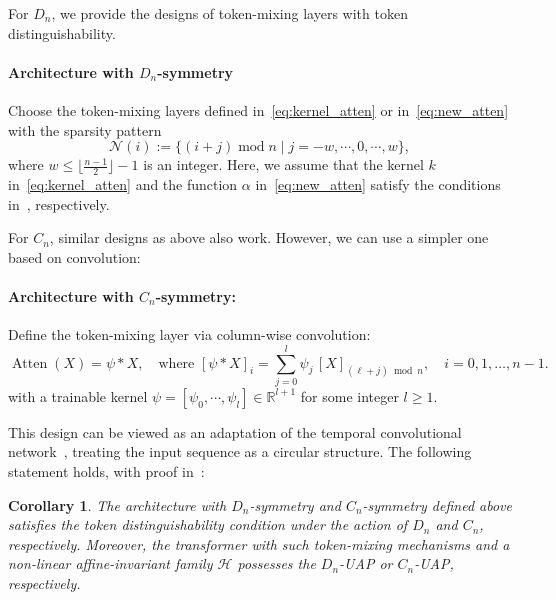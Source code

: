 \documentclass{article}
\newtheorem{corollary}{Corollary}
\newcommand{\ql}[1]{{\footnotesize\textcolor{red}{QL: #1}}}
\begin{document}

For $D_n$, we provide the designs of token-mixing layers with token distinguishability.
\paragraph{Architecture with $D_n$-symmetry}
 Choose the token-mixing layers defined in~\eqref{eq:kernel_atten} or in~\eqref{eq:new_atten} with the sparsity pattern 
    \begin{equation}
        \mathcal N(i):=\{(i+j)\operatorname{mod} n \mid j=-w,\cdots, 0,\cdots, w\},
    \end{equation}
    where $w\le\lfloor \frac{n-1}{2}\rfloor-1$ is an integer. Here, we assume that the kernel $k$ in~\eqref{eq:kernel_atten} and the function $\alpha$ in~\eqref{eq:new_atten} satisfy the conditions in~, respectively.

For $C_n$, similar designs as above also work. However, we can use a simpler one based on convolution:
\paragraph{Architecture with $C_n$-symmetry:}  Define the token-mixing layer via column-wise convolution:
    \begin{equation}
        \label{eq:conv}
        \operatorname{Atten}(X)= \psi * X, \quad \text{where }
        [\psi * X]_i = \sum_{j=0}^{l} \psi_{j}\, [X]_{(\ell + j) \bmod n}, \quad i = 0,1,\dots,n-1.
    \end{equation}
    with a trainable kernel $\psi=[\psi_{0},\cdots, \psi_l]\in\mathbb R^{l+1}$ for some integer $l\ge 1$.

This design can be viewed as an adaptation of the temporal convolutional network~\cite{lea2016temporal,jiang2023forward}, treating the input sequence as a circular structure. The following statement holds, with proof in~:
\begin{corollary}
    The architecture with $D_n$-symmetry and $C_n$-symmetry defined above satisfies the token distinguishability condition under the action of $D_n$ and $C_n$, respectively. Moreover, the transformer with such token-mixing mechanisms and a non-linear affine-invariant family $\mathcal H$ possesses the $D_n$-UAP or $C_n$-UAP, respectively.
\end{corollary}
\end{document}

